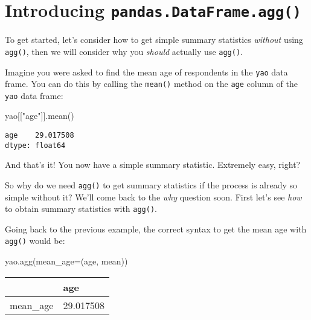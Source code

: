 \documentclass[
  letterpaper,
  DIV=11,
  numbers=noendperiod]{scrreprt}
\newenvironment{Shaded}{\begin{snugshade}}{\end{snugshade}}
\newcommand{\NormalTok}[1]{\textcolor[rgb]{0.00,0.23,0.31}{#1}}
\newcommand{\OperatorTok}[1]{\textcolor[rgb]{0.37,0.37,0.37}{#1}}
\newcommand{\StringTok}[1]{\textcolor[rgb]{0.13,0.47,0.30}{#1}}
\begin{document}
\section{\texorpdfstring{Introducing
\texttt{pandas.DataFrame.agg()}}{Introducing pandas.DataFrame.agg()}}\label{introducing-pandas.dataframe.agg}

To get started, let's consider how to get simple summary statistics
\emph{without} using \texttt{agg()}, then we will consider why you
\emph{should} actually use \texttt{agg()}.

Imagine you were asked to find the mean age of respondents in the
\texttt{yao} data frame. You can do this by calling the \texttt{mean()}
method on the \texttt{age} column of the \texttt{yao} data frame:

\begin{Shaded}
\begin{Highlighting}[]
\NormalTok{yao[[}\StringTok{"age"}\NormalTok{]].mean()}
\end{Highlighting}
\end{Shaded}

\begin{verbatim}
age    29.017508
dtype: float64
\end{verbatim}

And that's it! You now have a simple summary statistic. Extremely easy,
right?

So why do we need \texttt{agg()} to get summary statistics if the
process is already so simple without it? We'll come back to the
\emph{why} question soon. First let's see \emph{how} to obtain summary
statistics with \texttt{agg()}.

Going back to the previous example, the correct syntax to get the mean
age with \texttt{agg()} would be:

\begin{Shaded}
\begin{Highlighting}[]
\NormalTok{yao.agg(mean\_age}\OperatorTok{=}\NormalTok{(}\StringTok{\textquotesingle{}age\textquotesingle{}}\NormalTok{, }\StringTok{\textquotesingle{}mean\textquotesingle{}}\NormalTok{))}
\end{Highlighting}
\end{Shaded}

\begin{longtable}[]{@{}ll@{}}
\toprule\noalign{}
& age \\
\midrule\noalign{}
\endhead
\bottomrule\noalign{}
\endlastfoot
mean\_age & 29.017508 \\
\end{longtable}
\end{document}
